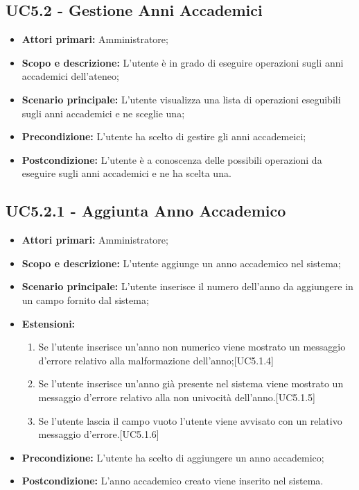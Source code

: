\documentclass[AnalisiDeiRequisiti.tex]{subfiles}
\begin{document}
\subsection{UC5.2 - Gestione Anni Accademici}
\begin{itemize}
	\item \textbf{Attori primari:} Amministratore;
	\item \textbf{Scopo e descrizione:} L'utente è in grado di eseguire operazioni sugli anni accademici dell'ateneo;
	\item \textbf{Scenario principale:} L'utente visualizza una lista di operazioni eseguibili sugli anni accademici e ne sceglie una;
	\item \textbf{Precondizione:} L'utente ha scelto di gestire gli anni accademeici; 
	\item \textbf{Postcondizione:} L'utente è a conoscenza delle possibili operazioni da eseguire sugli anni accademici e ne ha scelta una.
\end{itemize}
\subsection{UC5.2.1 - Aggiunta Anno Accademico}
\begin{itemize}
	\item \textbf{Attori primari:} Amministratore;
	\item \textbf{Scopo e descrizione:} L'utente aggiunge un anno accademico nel sistema;
	\item \textbf{Scenario principale:} L'utente inserisce il numero dell'anno da aggiungere in un campo fornito dal sistema;
	\item \textbf{Estensioni:}
	\begin{enumerate}
		\item Se l'utente inserisce un'anno non numerico viene mostrato un messaggio d'errore relativo alla malformazione dell'anno;[UC5.1.4]
		\item Se l'utente inserisce un'anno già presente nel sistema viene mostrato un messaggio d'errore relativo alla non univocità dell'anno.[UC5.1.5]
		\item Se l'utente lascia il campo vuoto l'utente viene avvisato con un relativo messaggio d'errore.[UC5.1.6]
	\end{enumerate}
	\item \textbf{Precondizione:} L'utente ha scelto di aggiungere un anno accademico; 
	\item \textbf{Postcondizione:} L'anno accademico creato viene inserito nel sistema.
\end{itemize}
\end{document}
